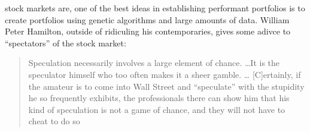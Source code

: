 \documentclass{article}
\begin{document}
    stock markets are, one of the best ideas in establishing performant portfolios is to create portfolios using genetic algorithms and large 
    amounts of data. William Peter Hamilton, outside of ridiculing his contemporaries, gives some adivce to ``spectators'' of the stock market:
    \begin{quotation}
        Speculation necessarily involves a large element of chance. \ldots It is the speculator himself who too often makes it a sheer gamble. \ldots
        [C]ertainly, if the amateur is to come into Wall Street and ``speculate'' with the stupidity he so frequently exhibits, the professionals there
        can show him that his kind of speculation is not a game of chance, and they will not have to cheat to do so
    \end{quotation}
    \cite{Hamilton}
    \newpage
    \printbibliography
\end{document}
